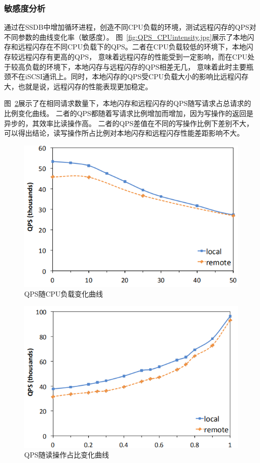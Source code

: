 \subsubsection{敏感度分析}
通过在SSDB中增加循环进程，创造不同CPU负载的环境，测试远程闪存的QPS对不同参数的曲线变化率（敏感度）。
图~\ref{fig:QPS_CPUintensity.jpg}展示了本地闪存和远程闪存在不同CPU负载下的QPS。二者在CPU负载较低的环境下，本地闪存较远程闪存有更高的QPS，
意味着远程闪存的性能受到一定影响，而在CPU处于较高负载的环境下，本地闪存与远程闪存的QPS相差无几，
意味着此时主要瓶颈不在iSCSI通讯上。同时，本地闪存的QPS受CPU负载大小的影响比远程闪存大，也就是说，远程闪存的性能表现更加稳定。


图~\ref{fig:QPS_percentage}展示了在相同请求数量下，本地闪存和远程闪存的QPS随写请求占总请求的比例变化曲线。
二者的QPS都随着写请求比例增加而增加，因为写操作的返回是异步的，其效率比读操作高。
二者的QPS差值在不同的写操作比例下差别不大，可以得出结论，读写操作所占比例对本地闪存和远程闪存性能差距影响不大。

\begin{figure}
\centering
\includegraphics[scale=0.8]{Figures/storage/QPS_CPUintensity.jpg}
\decoRule
\caption{QPS随CPU负载变化曲线}
\label{fig:QPS_CPUintensity}
\end{figure}

\begin{figure}
\centering
\includegraphics[scale=0.8]{Figures/storage/QPS_percentage.jpg}
\decoRule
\caption{QPS随读操作占比变化曲线}
\label{fig:QPS_percentage}
\end{figure}

